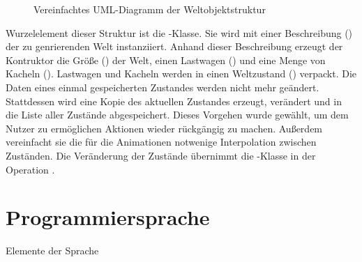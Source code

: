 \begin{figure}
  \caption{Vereinfachtes UML-Diagramm der Weltobjektstruktur}
  \label{fig:implementation:program:uml}
\end{figure}

Wurzelelement dieser Struktur ist die -Klasse. Sie wird mit einer Beschreibung () der zu genrierenden Welt instanziiert. Anhand dieser Beschreibung erzeugt der Kontruktor die Größe () der Welt, einen Lastwagen () und eine Menge von Kacheln (). Lastwagen und Kacheln werden in einen Weltzustand () verpackt. Die Daten eines einmal gespeicherten Zustandes werden nicht mehr geändert. Stattdessen wird eine Kopie des aktuellen Zustandes erzeugt, verändert und in die Liste aller Zustände abgespeichert. Dieses Vorgehen wurde gewählt, um dem Nutzer zu ermöglichen Aktionen wieder rückgängig zu machen. Außerdem vereinfacht sie die für die Animationen  notwenige Interpolation zwischen Zuständen. Die Veränderung der Zustände übernimmt die -Klasse in der Operation .

\section{Programmiersprache}

Elemente der Sprache

